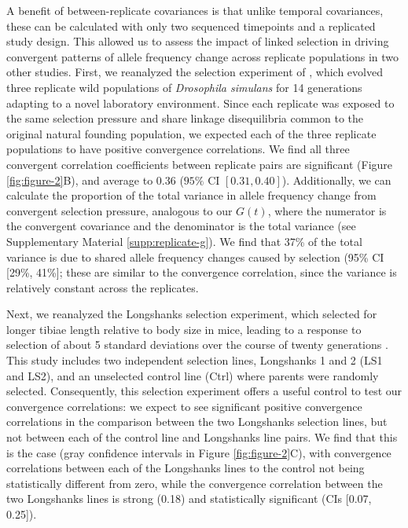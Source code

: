 \documentclass[11pt]{article}
\begin{document}
A benefit of between-replicate covariances is that unlike temporal covariances,
these can be calculated with only two sequenced timepoints and a replicated
study design. This allowed us to assess the impact of linked selection in
driving convergent patterns of allele frequency change across replicate
populations in two other studies. First, we reanalyzed the selection experiment
of \textcite{Kelly2019-dc}, which evolved three replicate wild populations of
\emph{Drosophila simulans} for 14 generations adapting to a novel laboratory
environment. Since each replicate was exposed to the same selection pressure
and share linkage disequilibria common to the original natural founding
population, we expected each of the three replicate populations to have
positive convergence correlations.  We find all three convergent
correlation coefficients between replicate pairs are significant (Figure
\ref{fig:figure-2}B), and average to 0.36 ($95\%$ CI $[0.31, 0.40]$).
Additionally, we can calculate the proportion of the total variance in
allele frequency change from convergent selection pressure, analogous to
our $G(t)$, where the numerator is the convergent covariance and the
denominator is the total variance (see Supplementary Material
\ref{supp:replicate-g}). We find that 37\% of the total variance is due to
shared allele frequency changes caused by selection (95\% CI [29\%, 41\%];
these are similar to the convergence correlation, since the variance is
relatively constant across the replicates.


Next, we reanalyzed the Longshanks selection experiment, which selected for
longer tibiae length relative to body size in mice, leading to a response to
selection of about 5 standard deviations over the course of twenty generations
\parencite{Marchini2014-de,Castro2019-uk}. This study includes two independent
selection lines, Longshanks 1 and 2 (LS1 and LS2), and an unselected control
line (Ctrl) where parents were randomly selected. Consequently, this selection
experiment offers a useful control to test our convergence correlations: we
expect to see significant positive convergence correlations in the comparison
between the two Longshanks selection lines, but not between each of the control
line and Longshanks line pairs. We find that this is the case (gray confidence
intervals in Figure \ref{fig:figure-2}C), with convergence correlations between
each of the Longshanks lines to the control not being statistically different
from zero, while the convergence correlation between the two Longshanks lines
is strong (0.18) and statistically significant (CIs [0.07, 0.25]).
\end{document}
